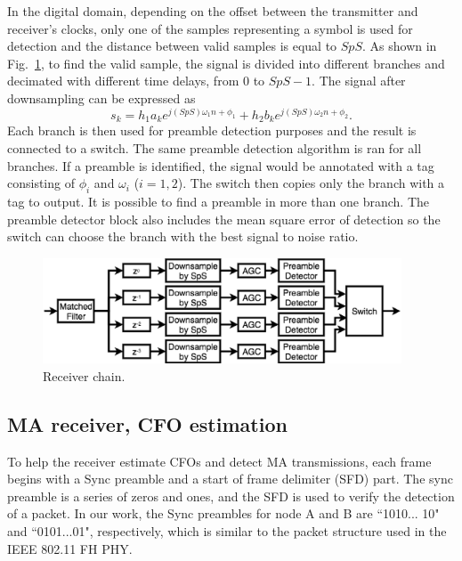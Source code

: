 In the digital domain, depending on the offset between the transmitter and receiver's clocks, only one of the samples representing a symbol is used for detection and the distance between valid samples is equal to $SpS$. As shown in Fig.~\ref{fig:pncreceiver}, to find the valid sample, the signal is divided into different branches and decimated with different time delays, from $0$ to $ SpS -1$. The signal after downsampling can be expressed as
\begin{equation}
    s_k=h_1 a_k e^{j (SpS) \omega_1 n + \phi_1} + h_2 b_k e^{j (SpS) \omega_2 n + \phi_2}.
\end{equation}
Each branch is then used for preamble detection purposes and the result is connected to a switch. The same preamble detection algorithm is ran for all branches. If a preamble is identified, the signal would be annotated with a tag consisting of $\phi_i$ and $\omega_i$ ($i=1,2$). The switch then copies only the branch with a tag to output. It is possible to find a preamble in more than one branch. The preamble detector block  also includes the mean square error of detection so the switch can choose the branch with the best signal to noise ratio. %



\begin{figure} [th]
    \centering
    \includegraphics[width=0.95\textwidth]{figures/pncreceiver.eps}
    \caption{Receiver chain.} \label{fig:pncreceiver}
\end{figure}


\subsection{MA receiver, CFO estimation}
To help the receiver estimate CFOs and detect MA transmissions, each frame begins with a Sync preamble and a start of frame delimiter (SFD) part. The sync preamble is a series of zeros and ones, and the SFD is used to verify the detection of a packet.  
In our work, the Sync preambles for node A and B are ``1010... 10" and ``0101...01", respectively, which is similar to the packet structure used in the IEEE 802.11 FH PHY.


